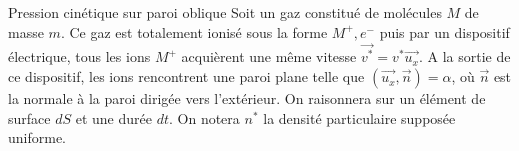 \begin{exo}[PC][1][colle]{Pression cinétique sur paroi oblique}
Soit un gaz constitué de molécules $M$ de masse $m$. Ce gaz est totalement ionisé sous la forme $M^+, e^-$ puis par un dispositif électrique, tous les ions $M^+$ acquièrent une même vitesse $\Vec{v^\ast}=v^\ast\Vec{u_x}$. A la sortie de ce dispositif, les ions rencontrent une paroi plane telle que $(\Vec{u_x},\Vec{n})=\alpha$, où $\Vec{n}$ est la normale à la paroi dirigée vers l'extérieur. On raisonnera sur un élément de surface $dS$ et une durée $dt$. On notera $n^\ast$ la densité particulaire supposée uniforme.

\begin{quest}



\end{quest}
\end{exo}

